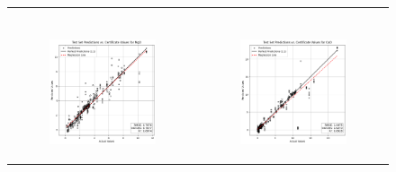 \begin{figure}
{\begin{tabular}{cc}
\begin{subfigure}{0.5\textwidth}
            \end{subfigure} \\
            \begin{subfigure}{0.5\textwidth}
                \includegraphics[width=\textwidth]{images/one_to_one/enetalpha01/MgO.png}
            \end{subfigure} & \hspace{3cm}
            \begin{subfigure}{0.5\textwidth}
                \includegraphics[width=\textwidth]{images/one_to_one/enetalpha01/CaO.png}

\end{subfigure}
\end{tabular}}
\end{figure}
